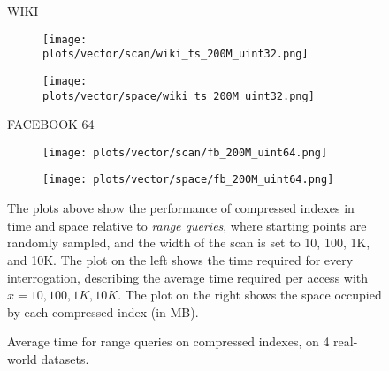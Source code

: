 \documentclass{article}
\begin{document}
\begin{figure}[!htbp]
{\begin{minipage}[t][0.98\textheight][t]{\textwidth}
    \begin{minipage}{0.03\linewidth}
    \begin{sideways}\small WIKI\end{sideways}
    \end{minipage}
    \begin{minipage}{0.32\linewidth}
        \begin{figure}[H]
        \texttt{[image: plots/vector/scan/wiki\_ts\_200M\_uint32.png]}
        \end{figure}
    \end{minipage}
    \begin{minipage}{0.32\linewidth}
        \begin{figure}[H]
            \texttt{[image: plots/vector/space/wiki\_ts\_200M\_uint32.png]}
        \end{figure}
    \end{minipage}
     \vspace*{-15px}

    \begin{minipage}{0.03\linewidth}
    \begin{sideways}\small FACEBOOK 64\end{sideways}
    \end{minipage}
    \begin{minipage}{0.32\linewidth}
        \begin{figure}[H]
        \texttt{[image: plots/vector/scan/fb\_200M\_uint64.png]}
        \end{figure}
    \end{minipage}
    \begin{minipage}{0.32\linewidth}
        \begin{figure}[H]
            \texttt{[image: plots/vector/space/fb\_200M\_uint64.png]}
        \end{figure}
    \end{minipage}
    \vfill

    \centering
    \begin{minipage}{\linewidth}
    The plots above show the performance of compressed indexes in time and space relative to \emph{range queries}, where starting points are randomly sampled, and the width of the scan is set to 10, 100, 1K, and 10K. The plot on the left shows the time required for every interrogation, describing the average time required per access with $x = 10, 100, 1K, 10K$. The plot on the right shows the space occupied by each compressed index (in MB). 
    \end{minipage}
    \vspace{20px}
\end{minipage}
}
\caption{Average time for range queries on compressed indexes, on 4 real-world datasets.}
\end{figure}
\end{document}
